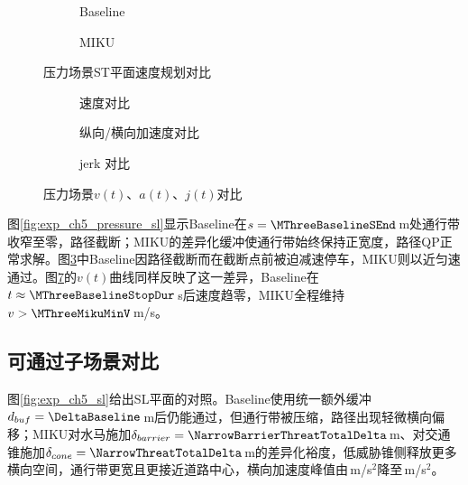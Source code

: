 \begin{figure}[H]
\centering
\begin{subfigure}[b]{0.48\textwidth}
  \centering
  
  \caption{Baseline}
  \label{fig:exp_ch5_pressure_st:a}
\end{subfigure}\hfill
\begin{subfigure}[b]{0.48\textwidth}
  \centering
  
  \caption{MIKU}
  \label{fig:exp_ch5_pressure_st:b}
\end{subfigure}
\caption{压力场景ST平面速度规划对比}
\label{fig:exp_ch5_pressure_st}
\end{figure}

\begin{figure}[H]
\centering
\begin{subfigure}[b]{\textwidth}
  \centering
  
  \caption{速度对比}
  \label{fig:exp_ch5_pressure_va:a}
\end{subfigure}

\begin{subfigure}[b]{\textwidth}
  \centering
  
  \caption{纵向/横向加速度对比}
  \label{fig:exp_ch5_pressure_va:b}
\end{subfigure}

\begin{subfigure}[b]{\textwidth}
  \centering
  
  \caption{jerk 对比}
  \label{fig:exp_ch5_pressure_va:c}
\end{subfigure}
\caption{压力场景$v(t)$、$a(t)$、$j(t)$对比}
\label{fig:exp_ch5_pressure_va}
\end{figure}

图\ref{fig:exp_ch5_pressure_sl}显示Baseline在$s=\MThreeBaselineSEnd$\,m处通行带收窄至零，路径截断；MIKU的差异化缓冲使通行带始终保持正宽度，路径QP正常求解。图\ref{fig:exp_ch5_pressure_st}中Baseline因路径截断而在截断点前被迫减速停车，MIKU则以近匀速通过。图\ref{fig:exp_ch5_pressure_va}的$v(t)$曲线同样反映了这一差异，Baseline在$t\approx\MThreeBaselineStopDur$\,s后速度趋零，MIKU全程维持$v>\MThreeMikuMinV$\,m/s。

\subsection{可通过子场景对比}

图\ref{fig:exp_ch5_sl}给出SL平面的对照。Baseline使用统一额外缓冲$d_{buf}=\DeltaBaseline$\,m后仍能通过，但通行带被压缩，路径出现轻微横向偏移；MIKU对水马施加$\delta_{barrier}=\NarrowBarrierThreatTotalDelta$\,m、对交通锥施加$\delta_{cone}=\NarrowThreatTotalDelta$\,m的差异化裕度，低威胁锥侧释放更多横向空间，通行带更宽且更接近道路中心，横向加速度峰值由\MSevenBaselineMaxAbsALat\,m/s$^2$降至\MSevenMikuMaxAbsALat\,m/s$^2$。

